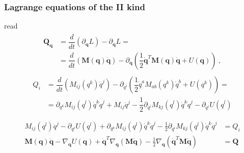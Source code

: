 \documentclass[letterpaper,10pt,english]{jupyterBook}
\begin{document}
\subsubsection{Lagrange equations of the II kind}
\label{\detokenize{ch/lagrange-properties:lagrange-equations-of-the-ii-kind}}\label{\detokenize{ch/lagrange-properties:classical-mechanics-lagrange-properties-lagrange-equations-ii}}
\sphinxAtStartPar
{} read
\begin{equation*}
\begin{split}\begin{aligned}
  \mathbf{Q}_{\mathbf{q}}
  & = \dfrac{d}{dt} \left( \partial_{\dot{\mathbf{q}}} L  \right) - \partial_{\mathbf{q}} L =  \\
  & = \dfrac{d}{dt} \left( \mathbf{M}(\mathbf{q}) \dot{\mathbf{q}} \right) - \partial_{\mathbf{q}} \left( \dfrac{1}{2} \dot{\mathbf{q}}^T \mathbf{M}(\mathbf{q}) \dot{\mathbf{q}} + U (\mathbf{q}) \right) \ ,
\end{aligned}\end{split}
\end{equation*}\begin{equation*}
\begin{split}\begin{aligned}
 Q_i 
 & = \dfrac{d}{dt} \left( M_{ij}(q^k) \dot{q}^j \right) - \partial_{q^i} \left( \dfrac{1}{2} \dot{q}^a M_{ab}(q^k) \dot{q}^b + U(q^k) \right) = \\
 & = \partial_{q^k} M_{ij}(q^l) \dot{q}^k \dot{q}^j + M_{ij} \ddot{q}^j - \dfrac{1}{2} \partial_{q^i} M_{kj}(q^l) \dot{q}^k \dot{q}^j - \partial_{q^i} U(q^l) \\
\end{aligned}\end{split}
\end{equation*}\begin{equation*}
\begin{split}\begin{aligned}
  M_{ij} (q^l) \ddot{q}^j - \partial_{q^i} U(q^l) + \partial_{q^k} M_{ij}(q^l) \dot{q}^k \dot{q}^j - \frac{1}{2} \partial_{q^i} M_{kj}(q^l) \dot{q}^k \dot{q}^j & = Q_i \\
  \mathbf{M}(\mathbf{q}) \ddot{\mathbf{q}} - \nabla_{\mathbf{q}} U(\mathbf{q}) + \dot{\mathbf{q}}^T \nabla_{\mathbf{q}} \left( \mathbf{M} \dot{\mathbf{q}} \right) - \frac{1}{2} \nabla_{\mathbf{q}} \left( \dot{\mathbf{q}}^T \mathbf{M} \dot{\mathbf{q}} \right) & = \mathbf{Q}
\end{aligned}\end{split}
\end{equation*}
\end{document}

